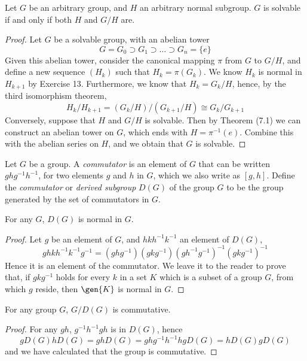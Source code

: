 \begin{theorem}
    Let $G$ be an arbitrary group, and $H$ an arbitrary normal subgroup. $G$ is solvable if and only if both $H$ and $G/H$ are.
\end{theorem}
\begin{proof}
    Let $G$ be a solvable group, with an abelian tower
    \[ G = G_0 \supset G_1 \supset \dots \supset G_n = \{ e \} \]
    Given this abelian tower, consider the canonical mapping $\pi$ from $G$ to $G/H$, and define a new sequence $(H_k)$ such that $H_k = \pi(G_k)$. We know $H_k$ is normal in $H_{k+1}$ by Exercise 13. Furthermore, we know that $H_k = G_k/H$, hence, by the third isomorphism theorem,
    \[ H_k/H_{k+1} = (G_k/H)/(G_{k+1}/H) \cong G_k/G_{k+1} \]
    Conversely, suppose that $H$ and $G/H$ is solvable. Then by Theorem (7.1) we can construct an abelian tower on $G$, which ends with $H = \pi^{-1}(e)$. Combine this with the abelian series on $H$, and we obtain that $G$ is solvable.
\end{proof}

Let $G$ be a group. A \emph{commutator} is an element of $G$ that can be written $ghg^{-1}h^{-1}$, for two elements $g$ and $h$ in $G$, which we also write as $[g,h]$. Define the \emph{commutator} or \emph{derived subgroup} $D(G)$ of the group $G$ to be the group generated by the set of commutators in $G$.

\begin{lemma}
    For any $G$, $D(G)$ is normal in $G$.
\end{lemma}
\begin{proof}
    Let $g$ be an element of $G$, and $hkh^{-1}k^{-1}$ an element of $D(G)$,
    \[ ghkh^{-1}k^{-1}g^{-1} = (ghg^{-1})(gkg^{-1})(gh^{-1}g^{-1})^{-1}(gkg^{-1})^{-1} \]
    Hence it is an element of the commutator. We leave it to the reader to prove that, if $gkg^{-1}$ holds for every $k$ in a set $K$ which is a subset of a group $G$, from which $g$ reside, then $\gen{K}$ is normal in $G$.
\end{proof}

\begin{lemma}
    For any group $G$, $G/D(G)$ is commutative.
\end{lemma}
\begin{proof}
    For any $gh$, $g^{-1}h^{-1}gh$ is in $D(G)$, hence
    \[ gD(G)hD(G) = ghD(G) = ghg^{-1}h^{-1}hgD(G) = hD(G)gD(G) \]
    and we have calculated that the group is commutative.
\end{proof}

